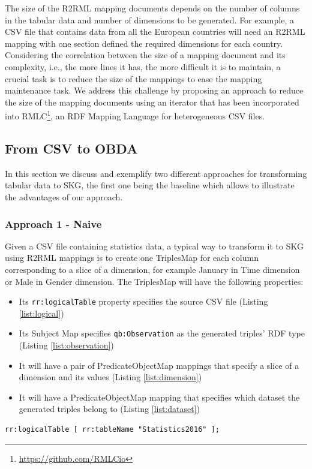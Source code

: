 The size of the R2RML mapping documents depends on the number of columns in the tabular data and number of dimensions to be generated. For example, a CSV file that contains data from all the European countries will need an R2RML mapping with one section defined the required dimensions for each country. Considering the correlation between the size of a mapping document and its complexity, i.e., the more lines it has, the more difficult it is to maintain, a crucial task is to reduce the size of the mappings to ease the mapping maintenance task. We address this challenge by proposing an approach to reduce the size of the mapping documents using an iterator that has been incorporated into RMLC\footnote{\url{https://github.com/RMLCio}}, an RDF Mapping Language for heterogeneous CSV files.

\subsection{From CSV to OBDA}
In this section we discuss and exemplify two different approaches for transforming tabular data to SKG, the first one being the baseline which allows to illustrate the advantages of our approach.

\subsubsection{Approach 1 - Naive}
Given a CSV file containing statistics data, a typical way to transform it to SKG using R2RML mappings is to create one TriplesMap for each column corresponding to a slice of a dimension, for example January in Time dimension or Male in Gender dimension. The TriplesMap will have the following properties:
\begin{itemize}
\item Its \texttt{rr:logicalTable} property specifies the source CSV file (Listing \ref{list:logical})
\item Its Subject Map specifies \texttt{qb:Observation} as the generated triples’ RDF type (Listing \ref{list:observation})
\item It will have a pair of PredicateObjectMap mappings that specify a slice of a dimension and its values (Listing \ref{list:dimension})
\item It will have a PredicateObjectMap mapping that specifies which dataset the generated triples belong to (Listing \ref{list:dataset})
\end{itemize}

\begin{lstlisting}[float,caption=Data source mapping,frame=tlrb,label={list:logical}, columns=fullflexible]
rr:logicalTable [ rr:tableName "Statistics2016" ];
\end{lstlisting}

